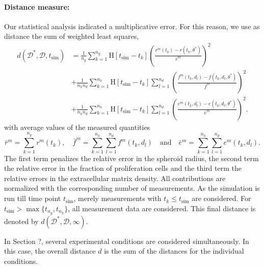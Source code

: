 \documentclass[10pt,letterpaper]{article}
\newcommand{\Heaviside}[1]{{\mathrm{H}\!\left[#1\right]}}
\begin{document}
\paragraph{Distance measure:}
Our statistical analysis indicated a multiplicative error. For this reason, we use as distance the sum of weighted least squares,
\begin{equation*}
\begin{aligned}
d(\mathcal{D}^*,\mathcal{D},t_{\text{sim}}) 
&= \frac{1}{n_g}\sum_{k=1}^{n_g} \Heaviside{t_{\text{sim}} - t_k} \! \left(\frac{r^m(t_k) - r(t_k,\theta^*)}{\bar{r}^m}\right)^2 \\
&+ \frac{1}{n_h n_d}\sum_{k=1}^{n_h} \Heaviside{t_{\text{sim}} - t_k} \sum_{l=1}^{n_d} \left(\frac{f^m(t_k,d_l) - f(t_k,d_l,\theta^*)}{\bar{f}^m}\right)^2 \\
&+ \frac{1}{n_h n_d} \sum_{k=1}^{n_h} \Heaviside{t_{\text{sim}} - t_k} \sum_{l=1}^{n_d} \left(\frac{e^m(t_k,d_l) - e(t_k,d_l,\theta^*)}{\bar{e}^m}\right)^2.
\end{aligned}
\end{equation*}
with average values of the measured quantities
\begin{equation*}
\bar{r}^m = \sum_{k=1}^{n_g} r^m(t_k), \quad
\bar{f}^m = \sum_{k=1}^{n_h} \sum_{l=1}^{n_d} f^m(t_k,d_l) \quad \text{and} \quad
\bar{e}^m = \sum_{k=1}^{n_h} \sum_{l=1}^{n_d} e^m(t_k,d_l).
\end{equation*}
The first term penalizes the relative error in the spheroid radius, the second term the relative error in the fraction of proliferation cells and the third term the relative errors in the extracellular matrix density. All contributions are normalized with the corresponding number of measurements. As the simulation is run till time point $t_{\text{sim}}$, merely measurements with $t_k \leq t_{\text{sim}}$ are considered. For $t_{\text{sim}} > \max\{t_{n_g},t_{n_h}\}$, all measurement data are considered. This final distance is denoted by $d(\mathcal{D}^*,\mathcal{D},\infty)$.

In Section {\color{green}?}, several experimental conditions are considered simultaneously. In this case, the overall distance $d$ is the sum of the distances for the individual conditions.

%
\end{document}
